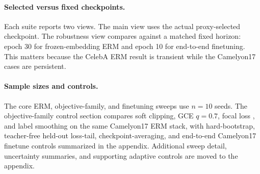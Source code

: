 \paragraph{Selected versus fixed checkpoints.}
Each suite reports two views.
The main view uses the actual proxy-selected checkpoint.
The robustness view compares against a matched fixed horizon: epoch 30 for frozen-embedding ERM and epoch 10 for end-to-end finetuning.
This matters because the CelebA ERM result is transient while the Camelyon17 cases are persistent.

\paragraph{Sample sizes and controls.}
The core ERM, objective-family, and finetuning sweeps use $n=10$ seeds.
The objective-family control section compares soft clipping, GCE $q=0.7$, focal loss \citep{lin2017focalloss}, and label smoothing on the same Camelyon17 ERM stack, with hard-bootstrap, teacher-free held-out loss-tail, checkpoint-averaging, and end-to-end Camelyon17 finetune controls summarized in the appendix.
Additional sweep detail, uncertainty summaries, and supporting adaptive controls are moved to the appendix.
